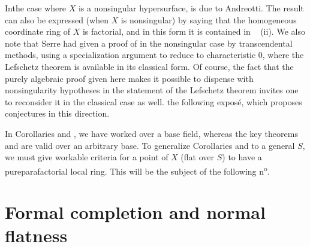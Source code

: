 \begin{remarque} \label{XII.3.8}
In\pageoriginale the case where $X$ is a nonsingular hypersurface,  is due to Andreotti. The result  can also be expressed (when $X$ is nonsingular) by saying that the homogeneous coordinate ring of $X$ is factorial, and in this form it is contained in ~ (ii). We also note that Serre had given a proof of  in the nonsingular case by transcendental methods, using a specialization argument to reduce to characteristic 0, where the Lefschetz theorem is available in its classical form. Of course, the fact that the purely algebraic proof given here makes it possible to dispense with nonsingularity hypotheses in the statement of the Lefschetz theorem invites one to reconsider it in the classical case as well. \Cf the following expos\'e, which proposes conjectures in this direction.

In Corollaries  and , we have worked over a base field, whereas the key theorems  and  are valid over an arbitrary base. To generalize Corollaries  and  to a general $S$, we must give workable criteria for a point of $X$ (flat over $S$) to have a \og pure\fg \resp parafactorial local ring. This will be the subject of the following n\textsuperscript{o}.
\end{remarque}

\section{Formal completion and normal flatness} \label{XII.4}

\setcounter{equation}{18}

